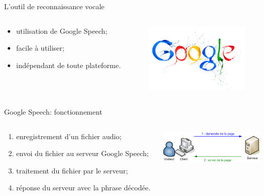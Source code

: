 \documentclass{beamer}
\begin{document}
\begin{frame}{L'outil de reconnaissance vocale}

	\begin{columns}[c]
	
	\begin{column}{5cm}
   		\begin{itemize}
			\item utilisation de Google Speech;
			\item facile à utiliser;
			\item indépendant de toute plateforme.
		\end{itemize}
  	\end{column}
	\begin{column}{5cm}
		\includegraphics[width=5cm]{google-logo}
  	\end{column}
	
	\end{columns}

\end{frame}

\begin{frame}{Google Speech: fonctionnement}

	\begin{columns}[c]
	
	\begin{column}{5cm}
   		\begin{enumerate}
			\item enregistrement d'un fichier audio;
			\item envoi du fichier au serveur Google Speech;
			\item traitement du fichier par le serveur;
			\item réponse du serveur avec la phrase décodée.
		\end{enumerate}
  	\end{column}
	\begin{column}{5cm}
		\includegraphics[width=5cm]{http}
  	\end{column}
	
	\end{columns}

\end{frame}
\end{document}
